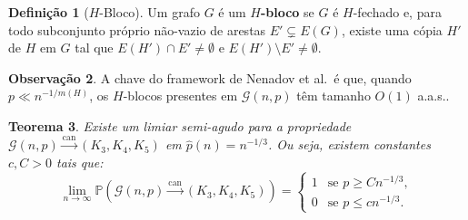 \documentclass[reqno, 12pt]{amsart}
\numberwithin{equation}{section}
\theoremstyle{plain}
\newtheorem{theorem}{Teorema}[section]
\theoremstyle{definition}
\newtheorem{definition}[theorem]{Definição}
\newtheorem{remark}[theorem]{Observação}
\newcommand{\Gnp}{\mathcal{G}(n,p)}
\newcommand{\maxdens}{m}
\newcommand{\whp}{a.a.s.}
\begin{document}
\begin{definition}[$H$-Bloco]
\label{def:H-bloco}
Um grafo $G$ é um \textbf{$H$-bloco} se $G$ é $H$-fechado e, para todo subconjunto próprio não-vazio de arestas $E' \subsetneq E(G)$, existe uma cópia $H'$ de $H$ em $G$ tal que $E(H') \cap E' \ne \emptyset$ e $E(H') \setminus E' \ne \emptyset$.
\end{definition}

\begin{remark}
A chave do framework de Nenadov et al.\ é que, quando $p \ll n^{-1/\maxdens(H)}$, os $H$-blocos presentes em $\Gnp$ têm tamanho $O(1)$ \whp.
\end{remark}

\begin{theorem}
  Existe um limiar semi-agudo para a propriedade $\Gnp \xrightarrow{\mathrm{can}} (K_3,K_4,K_5)$ em $\hat{p}(n) = n^{-1/3}$. Ou seja, existem constantes $c, C > 0$ tais que:
  \[
  \lim_{n \to \infty} \mathbb{P}(\Gnp \xrightarrow{\mathrm{can}} (K_3,K_4,K_5)) = 
  \begin{cases}
    1 & \text{se } p \ge C n^{-1/3}, \\
    0 & \text{se } p \le c n^{-1/3}.  
  \end{cases}
  \]
\end{theorem}
\end{document}
